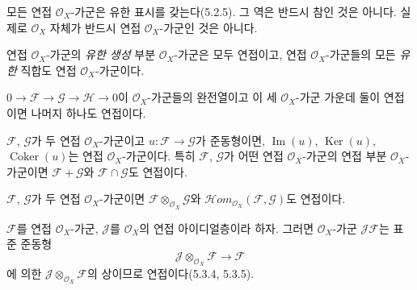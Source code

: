 \begin{env}[5.3.2]
\label{0.5.3.2-ko}
모든 연접 $\mathcal O_X$-가군은 유한 표시를 갖는다(5.2.5). 그 역은
반드시 참인 것은 아니다. 실제로 $\mathcal O_X$ 자체가 반드시 연접
$\mathcal O_X$-가군인 것은 아니다.

연접 $\mathcal O_X$-가군의 \emph{유한 생성} 부분
$\mathcal O_X$-가군은 모두 연접이고, 연접 $\mathcal O_X$-가군들의
모든 \emph{유한} 직합도 연접 $\mathcal O_X$-가군이다.
\end{env}

\begin{env}[5.3.3]
\label{0.5.3.3-ko}
$0\to\mathcal F\to\mathcal G\to\mathcal H\to0$이
$\mathcal O_X$-가군들의 완전열이고 이 세 $\mathcal O_X$-가군 가운데
둘이 연접이면 나머지 하나도 연접이다.
\end{env}

\begin{env}[5.3.4]
\label{0.5.3.4-ko}
$\mathcal F$, $\mathcal G$가 두 연접 $\mathcal O_X$-가군이고
$u:\mathcal F\to\mathcal G$가 준동형이면,
$\operatorname{Im}(u)$, $\operatorname{Ker}(u)$,
$\operatorname{Coker}(u)$는 연접 $\mathcal O_X$-가군이다. 특히
$\mathcal F$, $\mathcal G$가 어떤 연접 $\mathcal O_X$-가군의 연접
부분 $\mathcal O_X$-가군이면 $\mathcal F+\mathcal G$와
$\mathcal F\cap\mathcal G$도 연접이다.
\end{env}

\begin{env}[5.3.5]
\label{0.5.3.5-ko}
$\mathcal F$, $\mathcal G$가 두 연접 $\mathcal O_X$-가군이면
$\mathcal F\otimes_{\mathcal O_X}\mathcal G$와
$\mathcal H\!om_{\mathcal O_X}(\mathcal F,\mathcal G)$도 연접이다.
\end{env}

\begin{env}[5.3.6]
\label{0.5.3.6-ko}
$\mathcal F$를 연접 $\mathcal O_X$-가군, $\mathcal J$를
$\mathcal O_X$의 연접 아이디얼층이라 하자. 그러면
$\mathcal O_X$-가군 $\mathcal J\mathcal F$는 표준 준동형
\[
  \mathcal J\otimes_{\mathcal O_X}\mathcal F\longrightarrow\mathcal F
\]
에 의한 $\mathcal J\otimes_{\mathcal O_X}\mathcal F$의 상이므로
연접이다(5.3.4, 5.3.5).
\end{env}

